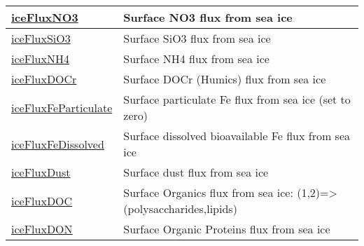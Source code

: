 {\begin{center}
\begin{longtable}{| p{2.0in} | p{4.0in} |}
    \hline
    \hyperref[subsec:var_sec_ecosysSeaIceCoupling_iceFluxNO3]{iceFluxNO3} & Surface NO3 flux from sea ice \\
    \hline
    \hyperref[subsec:var_sec_ecosysSeaIceCoupling_iceFluxSiO3]{iceFluxSiO3} & Surface SiO3 flux from sea ice \\
    \hline
    \hyperref[subsec:var_sec_ecosysSeaIceCoupling_iceFluxNH4]{iceFluxNH4} & Surface NH4 flux from sea ice \\
    \hline
    \hyperref[subsec:var_sec_ecosysSeaIceCoupling_iceFluxDOCr]{iceFluxDOCr} & Surface DOCr (Humics) flux from sea ice \\
    \hline
    \hyperref[subsec:var_sec_ecosysSeaIceCoupling_iceFluxFeParticulate]{iceFluxFeParticulate} & Surface particulate Fe flux from sea ice (set to zero) \\
    \hline
    \hyperref[subsec:var_sec_ecosysSeaIceCoupling_iceFluxFeDissolved]{iceFluxFeDissolved} & Surface dissolved bioavailable Fe flux from sea ice \\
    \hline
    \hyperref[subsec:var_sec_ecosysSeaIceCoupling_iceFluxDust]{iceFluxDust} & Surface dust flux from sea ice \\
    \hline
    \hyperref[subsec:var_sec_ecosysSeaIceCoupling_iceFluxDOC]{iceFluxDOC} & Surface Organics flux from sea ice: (1,2)=>(polysaccharides,lipids) \\
    \hline
    \hyperref[subsec:var_sec_ecosysSeaIceCoupling_iceFluxDON]{iceFluxDON} & Surface Organic Proteins flux from sea ice \\
    \hline
\end{longtable}
\end{center}
}
